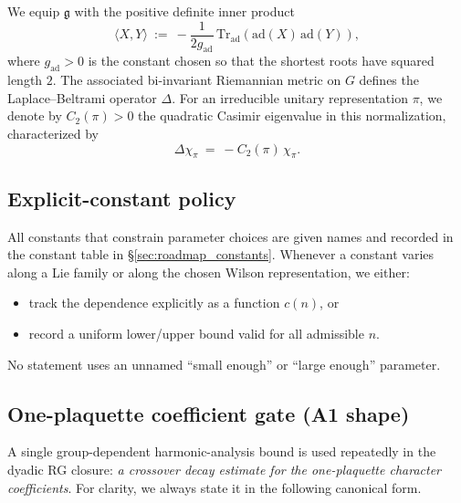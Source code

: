 \begin{definition}
\label{def:metric_casimir}
We equip $\mathfrak g$ with the positive definite inner product
\begin{equation}
\label{eq:metric_choice}
\langle X,Y\rangle\ :=\ -\frac{1}{2g_{\mathrm{ad}}}\,\mathrm{Tr}_{\mathrm{ad}}(\mathrm{ad}(X)\,\mathrm{ad}(Y)),
\end{equation}
where $g_{\mathrm{ad}}>0$ is the constant chosen so that the shortest roots have squared length $2$.
The associated bi-invariant Riemannian metric on $G$ defines the Laplace--Beltrami operator $\Delta$.
For an irreducible unitary representation $\pi$, we denote by $C_2(\pi)>0$ the quadratic Casimir eigenvalue in this normalization,
characterized by
\begin{equation}
\label{eq:casimir_eigen}
\Delta\chi_{\pi}\ =\ -C_2(\pi)\,\chi_{\pi}.
\end{equation}
\end{definition}

\subsection{Explicit-constant policy}
\label{subsec:conventions_constants}

All constants that constrain parameter choices are given names and recorded in the constant table in \S\ref{sec:roadmap_constants}.
Whenever a constant varies along a Lie family or along the chosen Wilson representation, we either:
\begin{itemize}
\item track the dependence explicitly as a function $c(n)$, or
\item record a uniform lower/upper bound valid for all admissible $n$.
\end{itemize}
No statement uses an unnamed ``small enough'' or ``large enough'' parameter.

\subsection{One-plaquette coefficient gate (A1 shape)}
\label{subsec:conventions_A1}

A single group-dependent harmonic-analysis bound is used repeatedly in the dyadic RG closure:
\emph{a crossover decay estimate for the one-plaquette character coefficients}.
For clarity, we always state it in the following canonical form.

